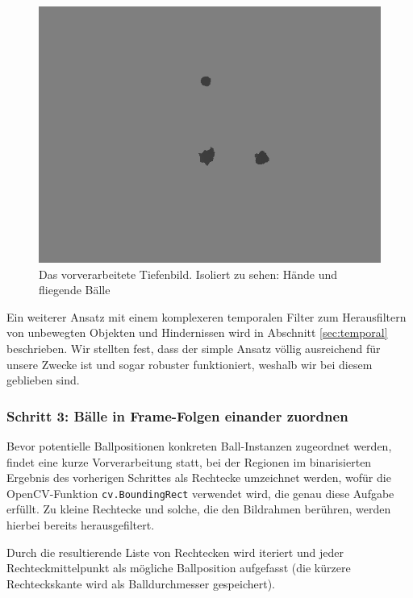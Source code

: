 \documentclass[12pt,a4paper,ngerman]{scrartcl}
\begin{document}
\begin{figure}[H]
    \centering
    \includegraphics[scale=0.6]{img/depth-binary.png}
    \vspace{-0.5cm}
    \caption{Das vorverarbeitete Tiefenbild. Isoliert zu sehen: Hände und fliegende Bälle}
    \label{rects-3}
\end{figure}


Ein weiterer Ansatz mit einem komplexeren temporalen Filter zum Herausfiltern von unbewegten Objekten und
Hindernissen wird in Abschnitt \ref{sec:temporal} beschrieben. Wir stellten fest, dass der simple Ansatz
völlig ausreichend für unsere Zwecke ist und sogar robuster funktioniert, weshalb wir bei diesem geblieben
sind.

\subsubsection{Schritt 3: Bälle in Frame-Folgen einander zuordnen}
\label{sec:ballzuordnung}

Bevor potentielle Ballpositionen konkreten Ball-Instanzen zugeordnet werden, findet eine kurze Vorverarbeitung statt, bei der Regionen im binarisierten Ergebnis des vorherigen Schrittes als Rechtecke umzeichnet werden, wofür die OpenCV-Funktion \lstinline{cv.BoundingRect} verwendet wird, die genau diese Aufgabe erfüllt. Zu kleine Rechtecke und solche, die den Bildrahmen berühren, werden hierbei bereits herausgefiltert.

Durch die resultierende Liste von Rechtecken wird iteriert und jeder
Rechteckmittelpunkt als mögliche Ballposition aufgefasst (die kürzere Rechteckskante
wird als Balldurchmesser gespeichert).
\end{document}
